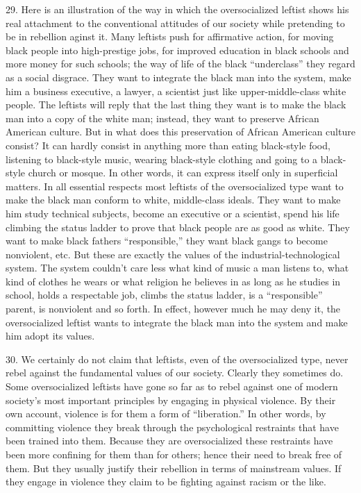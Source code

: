 \documentclass{article}
\begin{document}
29.  Here is an illustration of the way in which the oversocialized leftist shows his real attachment 
to  the  conventional  attitudes  of  our  society  while  pretending  to  be  in  rebellion  aginst  it.   Many 
leftists push for affirmative action, for moving black people into high-prestige jobs, for improved 
education  in  black  schools  and  more  money  for  such  schools;  the  way  of  life  of  the  black  
“underclass”  they  regard  as  a  social  disgrace.   They  want  to  integrate  the  black  man  into  the  
system,  make  him  a  business  executive,  a  lawyer,  a  scientist  just  like  upper-middle-class  white  
people.  The leftists will reply that the last thing they want is to make the black man into a copy of 
the  white  man;  instead,  they  want  to  preserve  African  American  culture.   But  in  what  does  this  
preservation  of  African  American  culture  consist?  It  can  hardly  consist  in  anything  more  than  
eating black-style food, listening to black-style music, wearing black-style clothing and going to a 
black-style church or mosque.  In other words, it can express itself only in superficial matters.  In 
all essential respects most leftists of the oversocialized type want to make the black man conform 
to  white,  middle-class  ideals.   They  want  to  make  him  study  technical  subjects,  become  an  
executive or a scientist, spend his life climbing the status ladder to prove that black people are as 
good as white.  They want to make black fathers “responsible,” they want black gangs to become 
nonviolent,  etc.   But  these  are  exactly  the  values  of  the  industrial-technological  system.   The 
system couldn’t care less what kind of music a man listens to, what kind of clothes he wears or 
what  religion  he  believes  in  as  long  as  he  studies  in  school,  holds  a  respectable  job,  climbs  the  
status  ladder,  is  a  “responsible”  parent,  is  nonviolent  and  so  forth.   In  effect,  however  much  he  
may deny it, the oversocialized leftist wants to integrate the black man into the system and make 
him adopt its values. \vspace{\baselineskip}

30.  We certainly do not claim that leftists, even of the oversocialized type, never rebel against the 
fundamental values of our society.  Clearly they sometimes do.  Some oversocialized leftists have 
gone so far as to rebel against one of modern society’s most important principles by engaging in 
physical  violence.   By  their  own  account,  violence  is  for  them  a  form  of  “liberation.”  In  other  
words,  by  committing  violence  they  break  through  the  psychological  restraints  that  have  been  
trained into them.  Because they are oversocialized these restraints have been more confining for 
them than for others; hence their need to break free of them.  But they usually justify their rebellion 
in terms of mainstream values.  If they engage in violence they claim to be fighting against racism 
or the like. \vspace{\baselineskip}
\end{document}
